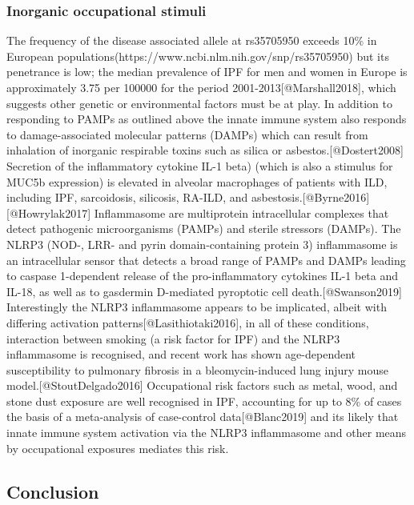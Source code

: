 \documentclass[
]{article}
\begin{document}
\hypertarget{inorganic-occupational-stimuli}{%
\subsubsection{Inorganic occupational
stimuli}\label{inorganic-occupational-stimuli}}

The frequency of the disease associated allele at rs35705950 exceeds
10\% in European
populations(https://www.ncbi.nlm.nih.gov/snp/rs35705950) but its
penetrance is low; the median prevalence of IPF for men and women in
Europe is approximately 3.75 per 100000 for the period
2001-2013{[}@Marshall2018{]}, which suggests other genetic or
environmental factors must be at play. In addition to responding to
PAMPs as outlined above the innate immune system also responds to
damage-associated molecular patterns (DAMPs) which can result from
inhalation of inorganic respirable toxins such as silica or
asbestos.{[}@Dostert2008{]} Secretion of the inflammatory cytokine IL-1
beta) (which is also a stimulus for MUC5b expression) is elevated in
alveolar macrophages of patients with ILD, including IPF, sarcoidosis,
silicosis, RA-ILD, and asbestosis.{[}@Byrne2016{]}{[}@Howrylak2017{]}
Inflammasome are multiprotein intracellular complexes that detect
pathogenic microorganisms (PAMPs) and sterile stressors (DAMPs). The
NLRP3 (NOD-, LRR- and pyrin domain-containing protein 3) inflammasome is
an intracellular sensor that detects a broad range of PAMPs and DAMPs
leading to caspase 1-dependent release of the pro-inflammatory cytokines
IL-1 beta and IL-18, as well as to gasdermin D-mediated pyroptotic cell
death.{[}@Swanson2019{]} Interestingly the NLRP3 inflammasome appears to
be implicated, albeit with differing activation
patterns{[}@Lasithiotaki2016{]}, in all of these conditions, interaction
between smoking (a risk factor for IPF) and the NLRP3 inflammasome is
recognised, and recent work has shown age-dependent susceptibility to
pulmonary fibrosis in a bleomycin-induced lung injury mouse
model.{[}@StoutDelgado2016{]} Occupational risk factors such as metal,
wood, and stone dust exposure are well recognised in IPF, accounting for
up to 8\% of cases the basis of a meta-analysis of case-control
data{[}@Blanc2019{]} and its likely that innate immune system activation
via the NLRP3 inflammasome and other means by occupational exposures
mediates this risk.

\hypertarget{conclusion-3}{%
\subsection{Conclusion}\label{conclusion-3}}
\end{document}
